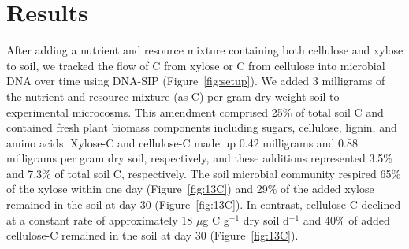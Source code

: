 \section{Results}
After adding a nutrient and resource mixture containing
both cellulose and xylose to soil, we tracked the flow of C from xylose or
C from cellulose into microbial DNA over time using DNA-SIP
(Figure~\ref{fig:setup}). We added 3 milligrams of the nutrient and resource
mixture (as C) per gram dry weight soil to experimental microcosms. This
amendment comprised 25\% of total soil C and contained
fresh plant biomass components including sugars, cellulose, lignin, and amino
acids. Xylose-C and cellulose-C made up 0.42 milligrams and 0.88 milligrams per
gram dry soil, respectively, and these additions represented 3.5\% and 7.3\%
of total soil C, respectively. The soil microbial community respired 65\% of
the xylose within one day (Figure~\ref{fig:13C}) and 29\% of the added xylose
remained in the soil at day 30 (Figure~\ref{fig:13C}). In contrast, cellulose-C
declined at a constant rate of approximately 18 $\mu$g C g$^{-1}$ dry soil
d$^{-1}$ and 40\% of added cellulose-C remained in the soil at day 30
(Figure~\ref{fig:13C}). 

